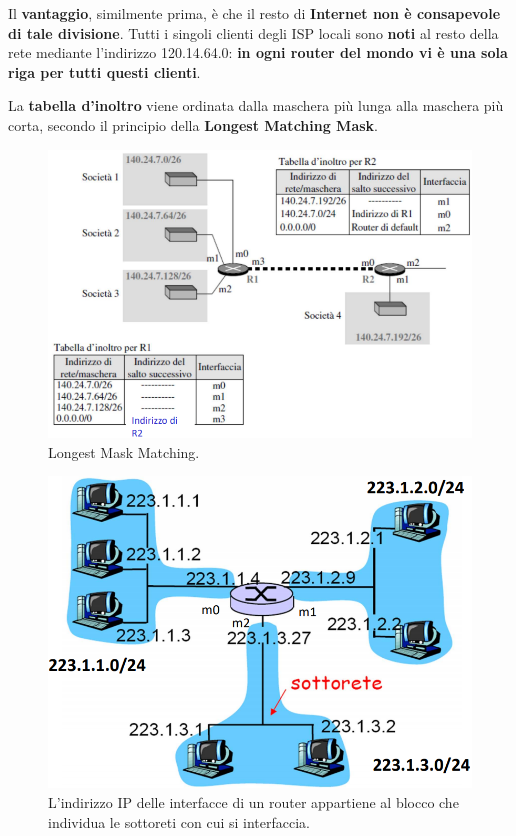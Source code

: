 \documentclass[11pt,a4paper,oneside]{book}
\theoremstyle{definition}
\begin{document}
Il \textbf{vantaggio}, similmente prima, è che il resto di \textbf{Internet non è consapevole di tale divisione}.
Tutti i singoli clienti degli ISP locali sono \textbf{noti} al resto della rete mediante l'indirizzo 120.14.64.0: \textbf{in ogni router del mondo vi è una sola riga per tutti questi clienti}.

\pagebreak

La \textbf{tabella d'inoltro} viene ordinata dalla maschera più lunga alla maschera più corta, secondo il principio della \textbf{Longest Matching Mask}.

\begin{figure}[!h]
	\includegraphics[scale=0.47]{Immagini/Ip_lmm.png}
	\centering
	\caption{Longest Mask Matching.}
\end{figure}

\begin{figure}[!h]
	\includegraphics[scale=0.3]{Immagini/Ip_int.png}
	\centering
	\caption{L'indirizzo IP delle interfacce di un router appartiene al blocco che individua le sottoreti con cui si interfaccia.}
\end{figure}
\end{document}
